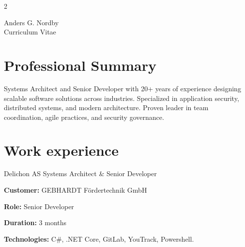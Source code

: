 \documentclass[10pt]{article} %
\begin{document}
\begin{paracol}{2} %


\parbox[top][0.12\textheight][c]{\linewidth}{ %
	\vspace{-0.04\textheight} %
	\centering %
	{\sffamily\Huge Anders G. Nordby}\\\medskip %
	{\Huge\color{headings}\cvtextfont Curriculum Vitae}
}


\section{Professional Summary}

Systems Architect and Senior Developer with 20+ years of experience designing scalable software solutions across industries. Specialized in application security, distributed systems, and modern architecture. Proven leader in team coordination, agile practices, and security governance.


\section{Work experience} 

{}
{Delichon AS} 
{Systems Architect \& Senior Developer} 
{
\textbf{Customer:} GEBHARDT Fördertechnik GmbH 

\textbf{Role:} Senior Developer

\textbf{Duration:} 3 months

\textbf{Technologies:} C\#, .NET Core, GitLab, YouTrack, Powershell.

}
\end{paracol}
\end{document}
